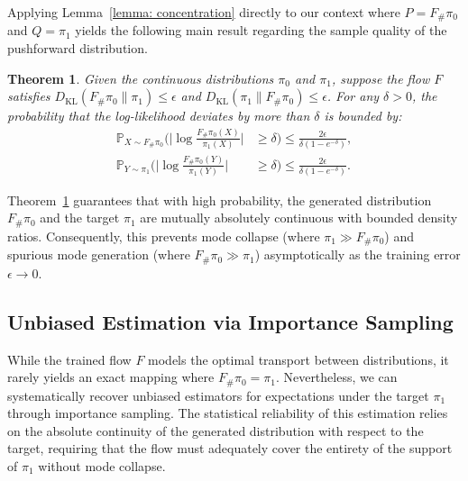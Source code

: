\documentclass[%
 reprint,
 amsmath,amssymb,
 aps,
 pre,
]{revtex4-2}
\newtheorem{theorem}{Theorem}
\DeclareMathOperator{\KL}{KL}
\newcommand{\Ge}{\geqslant}
\newcommand{\Le}{\leqslant}
\begin{document}
Applying Lemma~\ref{lemma: concentration} directly to our context where $P = F_\# \pi_0$ and $Q = \pi_1$ yields the following main result regarding the sample quality of the pushforward distribution.

\begin{theorem}
\label{theorem: concentration}
Given the continuous distributions $\pi_0$ and $\pi_1$,
suppose the flow $F$ satisfies $D_{\KL}(F_\#\pi_0\|\pi_1) \Le \epsilon$ and $D_{\KL}(\pi_1\|F_\#\pi_0) \Le \epsilon$. For any $\delta > 0$, the probability that the log-likelihood deviates by more than $\delta$ is bounded by:
\begin{align}
	\mathbb{P}_{X\sim F_\#\pi_0} \bigg( \bigg| \log \frac{F_\#\pi_0(X)}{\pi_1(X)} \bigg| & \Ge \delta \bigg) 
	\Le \frac{2\epsilon}{\delta(1 - e^{-\delta})},	\\
 \mathbb{P}_{Y\sim \pi_1} \bigg( \bigg| \log \frac{F_\#\pi_0(Y)}{\pi_1(Y)} \bigg| & \Ge \delta \bigg) \Le \frac{2\epsilon}{\delta(1 - e^{-\delta})}.
\end{align}
\end{theorem}
Theorem~\ref{theorem: concentration} guarantees that with high probability, the generated distribution $F_\#\pi_0$ and the target $\pi_1$ are mutually absolutely continuous with bounded density ratios. Consequently, this prevents mode collapse (where $\pi_1 \gg F_\#\pi_0$) and spurious mode generation (where $F_\#\pi_0 \gg \pi_1$) asymptotically as the training error $\epsilon \to 0$.

\mbox{}

\subsection{Unbiased Estimation via Importance Sampling}

While the trained flow $F$ models the optimal transport between distributions, it rarely yields an exact mapping where $F_\#\pi_0 = \pi_1$. Nevertheless, we can systematically recover unbiased estimators for expectations under the target $\pi_1$ through importance sampling. The statistical reliability of this estimation relies on the absolute continuity of the generated distribution with respect to the target, requiring that the flow must adequately cover the entirety of the support of $\pi_1$ without mode collapse.
\end{document}
